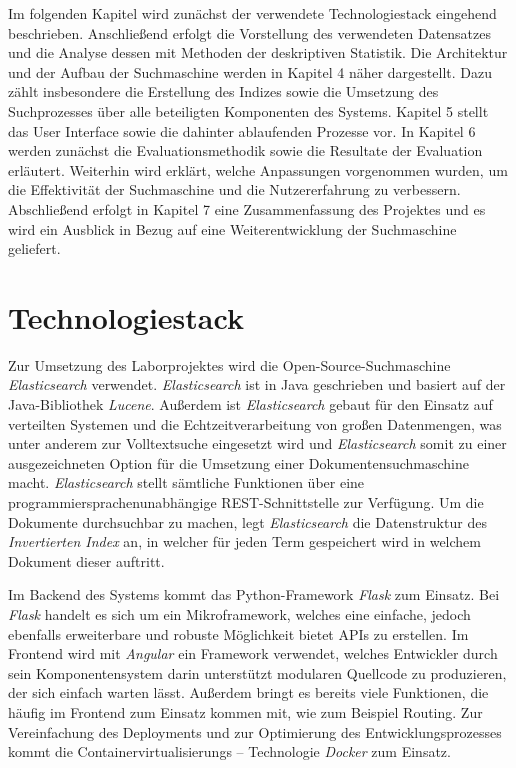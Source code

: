 \documentclass[11pt,a4paper, halfparskip]{scrartcl}
\begin{document}
Im folgenden Kapitel wird zunächst der verwendete Technologiestack eingehend beschrieben.
Anschließend erfolgt die Vorstellung des verwendeten Datensatzes und die Analyse dessen mit Methoden der deskriptiven Statistik. 
Die Architektur und der Aufbau der Suchmaschine werden in Kapitel 4 näher dargestellt. 
Dazu zählt insbesondere die Erstellung des Indizes sowie die Umsetzung des Suchprozesses über alle beteiligten Komponenten des Systems.
Kapitel 5 stellt das User Interface sowie die dahinter ablaufenden Prozesse vor.
In Kapitel 6 werden zunächst die Evaluationsmethodik sowie die Resultate der Evaluation erläutert.
Weiterhin wird erklärt, welche Anpassungen vorgenommen wurden, um die Effektivität der Suchmaschine und die Nutzererfahrung zu verbessern.
Abschließend erfolgt in Kapitel 7 eine Zusammenfassung des Projektes und es wird ein Ausblick in Bezug auf eine Weiterentwicklung der Suchmaschine geliefert.

\section{Technologiestack}

Zur Umsetzung des Laborprojektes wird die Open-Source-Suchmaschine \textit{Elasticsearch} verwendet. 
\textit{Elasticsearch} ist in Java geschrieben und basiert auf der Java-Bibliothek \textit{Lucene}. 
Außerdem ist \textit{Elasticsearch} gebaut für den Einsatz auf verteilten Systemen und die Echtzeitverarbeitung von großen Datenmengen, was unter anderem zur Volltextsuche eingesetzt wird und \textit{Elasticsearch} somit zu einer ausgezeichneten Option für die Umsetzung einer Dokumentensuchmaschine macht.
\textit{Elasticsearch} stellt sämtliche Funktionen über eine programmiersprachenunabhängige REST-Schnittstelle zur Verfügung.
Um die Dokumente durchsuchbar zu machen, legt \textit{Elasticsearch} die Datenstruktur des \textit{Invertierten Index} an, in welcher für jeden Term gespeichert wird in welchem Dokument dieser auftritt.

Im Backend des Systems kommt das Python-Framework \textit{Flask} zum Einsatz. 
Bei \textit{Flask} handelt es sich um ein Mikroframework, welches eine einfache, jedoch ebenfalls erweiterbare und robuste Möglichkeit bietet APIs zu erstellen.
Im Frontend wird mit \textit{Angular} ein Framework verwendet, welches Entwickler durch sein Komponentensystem darin unterstützt modularen Quellcode zu produzieren, der sich einfach warten lässt.
Außerdem bringt es bereits viele Funktionen, die häufig im Frontend zum Einsatz kommen mit, wie zum Beispiel Routing. 
Zur Vereinfachung des Deployments und zur Optimierung des Entwicklungsprozesses kommt die Containervirtualisierungs – Technologie \textit{Docker} zum Einsatz.
\end{document}
